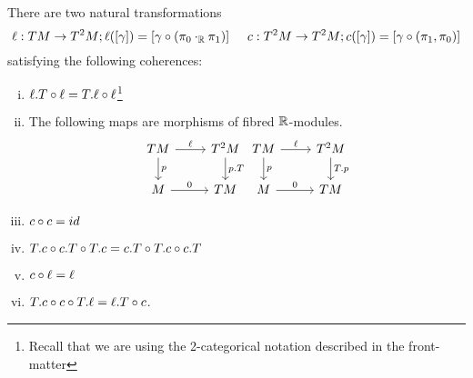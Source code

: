 \begin{proposition}
    There are two natural transformations
    \[
        \ell: TM \to T^2M; \ell([\gamma]) = [\gamma \circ (\pi_0 \cdot_{\mathbb{R}} \pi_1)] \hspace{0.5cm}
        c: T^2M \to T^2M; c([\gamma]) = [\gamma \circ (\pi_1, \pi_0)]
    \]
    satisfying the following coherences:
    \begin{enumerate}[(i)]
        \item $\ell.T \circ \ell = T.\ell \circ \ell$\footnote{Recall that we are using the 2-categorical notation described in the front-matter}
        \item The following maps are morphisms of fibred $\mathbb{R}$-modules. 
        \[\begin{tikzcd}
            TM & {T^2M} \\
            M & TM
            \arrow["\ell", from=1-1, to=1-2]
            \arrow["p", from=1-1, to=2-1]
            \arrow["{p.T}", from=1-2, to=2-2]
            \arrow["0", from=2-1, to=2-2]
        \end{tikzcd}%
        \begin{tikzcd}
            TM & {T^2M} \\
            M & TM
            \arrow["\ell", from=1-1, to=1-2]
            \arrow["p", from=1-1, to=2-1]
            \arrow["{T.p}", from=1-2, to=2-2]
            \arrow["0", from=2-1, to=2-2]
        \end{tikzcd}\]
        \item $c \circ c = id$
        \item $T.c \circ c.T \circ T.c = c.T \circ T.c \circ c.T$
        \item $c \circ \ell = \ell$
        \item $T.c \circ c \circ T.\ell = \ell.T \circ c$.
    \end{enumerate}
\end{proposition}
